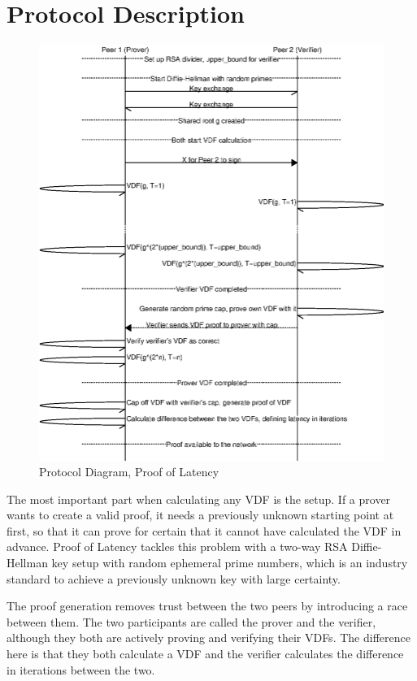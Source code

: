 \section{Protocol Description}
\begin{figure}
  \includegraphics[width=\textwidth]{pictures/pol2_diagram.eps}
  \caption{Protocol Diagram, Proof of Latency}
  \label{PoL Diagram 2}
\end{figure}
The most important part when calculating any VDF is the setup. If a prover wants to create a valid proof, it needs a previously unknown starting point at first, so that it can prove for certain that it cannot have calculated the VDF in advance. Proof of Latency tackles this problem with a two-way RSA Diffie-Hellman key setup with random ephemeral prime numbers, which is an industry standard to achieve a previously unknown key with large certainty. 

The proof generation removes trust between the two peers by introducing a race between them. The two participants are called the prover and the verifier, although they both are actively proving and verifying their VDFs. The difference here is that they both calculate a VDF and the verifier calculates the difference in iterations between the two.

